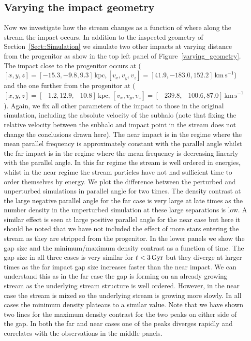 \documentclass[useAMS,usenatbib,fleqn,a4paper]{mn2e}
\def\Gyr{\,{\rm Gyr}}
\begin{document}
\subsection{Varying the impact geometry}
Now we investigate how the stream changes as a function of where along the stream the impact occurs. In addition to the inspected geometry of Section~\ref{Sect::Simulation} we simulate two other impacts at varying distance from the progenitor as show in the top left panel of Figure~\ref{varying_geometry}. The impact close to the progenitor occurs at ($[x,y,z]=[-15.3,-9.8,9.3]\,\mathrm{kpc},[v_x,v_y,v_z]=[41.9,-183.0,152.2]\,\mathrm{km\,s}^{-1}$) and the one further from the progenitor at ($[x,y,z]=[-1.2,12.9,-10.8]\,\mathrm{kpc},\,[v_x,v_y,v_z]=[-239.8,-100.6,87.0]\,\mathrm{km\,s}^{-1}$). Again, we fix all other parameters of the impact to those in the original simulation, including the absolute velocity of the subhalo (note that fixing the relative velocity between the subhalo and impact point in the stream does not change the conclusions drawn here). The near impact is in the regime where the mean parallel frequency is approximately constant with the parallel angle whilst the far impact is in the regime where the mean frequency is decreasing linearly with the parallel angle. In this far regime the stream is well ordered in energies, whilst in the near regime the stream particles have not had sufficient time to order themselves by energy. We plot the difference between the perturbed and unperturbed simulations in parallel angle for two times. The density contrast at the large negative parallel angle for the far case is very large at late times as the number density in the unperturbed simulation at these large separations is low. A similar effect is seen at large positive parallel angle for the near case but here it should be noted that we have not included the effect of more stars entering the stream as they are stripped from the progenitor. In the lower panels we show the gap size and the minimum/maximum density contrast as a function of time. The gap size in all three cases is very similar for $t<3\Gyr$ but they diverge at larger times as the far impact gap size increases faster than the near impact. We can understand this as in the far case the gap is forming on an already growing stream as the underlying stream structure is well ordered. However, in the near case the stream is mixed so the underlying stream is growing more slowly. In all cases the minimum density plateaus to a similar value. Note that we have shown two lines for the maximum density contrast for the two peaks on either side of the gap. In both the far and near cases one of the peaks diverges rapidly and correlates with the observations in the middle panels.
\end{document}
